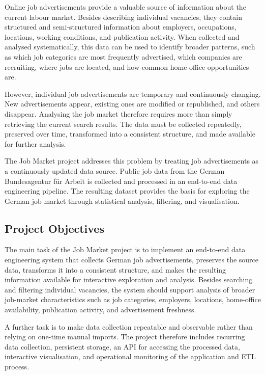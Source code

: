 \documentclass[11pt,a4paper]{article}
\begin{document}
Online job advertisements provide a valuable source of information about the current labour market. Besides describing individual vacancies, they contain structured and semi-structured information about employers, occupations, locations, working conditions, and publication activity. When collected and analysed systematically, this data can be used to identify broader patterns, such as which job categories are most frequently advertised, which companies are recruiting, where jobs are located, and how common home-office opportunities are.

However, individual job advertisements are temporary and continuously changing. New advertisements appear, existing ones are modified or republished, and others disappear. Analysing the job market therefore requires more than simply retrieving the current search results. The data must be collected repeatedly, preserved over time, transformed into a consistent structure, and made available for further analysis.

The Job Market project addresses this problem by treating job advertisements as a continuously updated data source. Public job data from the German Bundesagentur für Arbeit is collected and processed in an end-to-end data engineering pipeline. The resulting dataset provides the basis for exploring the German job market through statistical analysis, filtering, and visualisation.


\subsection{Project Objectives}

The main task of the Job Market project is to implement an end-to-end data engineering system that collects German job advertisements, preserves the source data, transforms it into a consistent structure, and makes the resulting information available for interactive exploration and analysis. Besides searching and filtering individual vacancies, the system should support analysis of broader job-market characteristics such as job categories, employers, locations, home-office availability, publication activity, and advertisement freshness.

A further task is to make data collection repeatable and observable rather than relying on one-time manual imports. The project therefore includes recurring data collection, persistent storage, an API for accessing the processed data, interactive visualisation, and operational monitoring of the application and ETL process.
\end{document}
